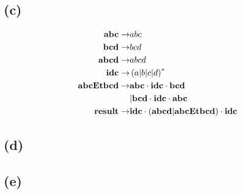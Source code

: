 \documentclass[class=article]{standalone}
\begin{document}
\subsection*{(c)}
\begin{align*}
    {\bf{abc}} \rightarrow&
        abc\\
    {\bf{bcd}} \rightarrow&
        bcd\\
    {\bf{abcd}} \rightarrow&
        abcd\\
    {\bf{idc}} \rightarrow&
        \left ( a|b|c|d \right )^*\\
    {\bf{abcEtbcd}} \rightarrow&
        {\bf{abc}} \cdot {\bf{idc}} \cdot {\bf{bcd}}\\&
        |{\bf{bcd}} \cdot {\bf{idc}} \cdot {\bf{abc}}\\
    {\bf{result}} \rightarrow&
    {\bf{idc}} \cdot \left ( {\bf{abcd}}|{\bf{abcEtbcd}} \right ) \cdot {\bf{idc}}
\end{align*}

\subsection*{(d)}
\subsection*{(e)}
\end{document}
